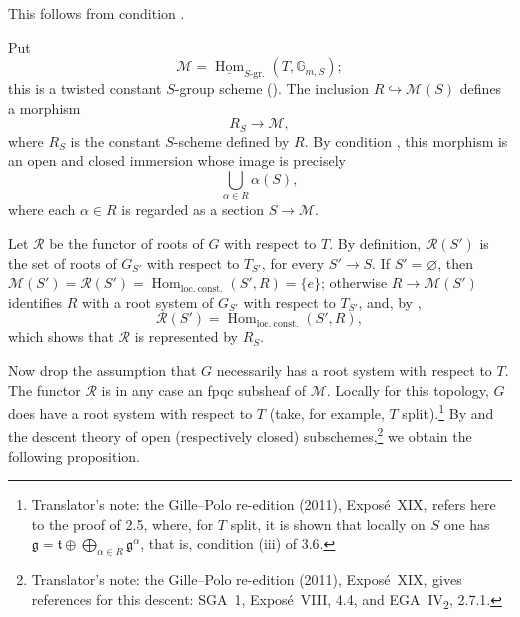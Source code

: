 This follows from condition .

Put
\[
  \mathcal M
  =
  \underline{\operatorname{Hom}}_{S\text{-gr.}}
  (T,\mathbb G_{m,S});
\]
this is a twisted constant \(S\)-group scheme ().  The inclusion
\(R\hookrightarrow\mathcal M(S)\) defines a morphism
\[
  R_S\longrightarrow\mathcal M,
\]
where \(R_S\) is the constant \(S\)-scheme defined by \(R\).  By
condition , this morphism is an open and closed immersion whose
image is precisely
\[
  \bigcup_{\alpha\in R}\alpha(S),
\]
where each \(\alpha\in R\) is regarded as a section
\(S\to\mathcal M\).

Let \(\mathcal R\) be the functor of roots of \(G\) with respect to
\(T\).  By definition, \(\mathcal R(S')\) is the set of roots of
\(G_{S'}\) with respect to \(T_{S'}\), for every \(S'\to S\).  If
\(S'=\varnothing\), then
\(\mathcal M(S')=\mathcal R(S')
=\operatorname{Hom}_{\mathrm{loc.\ const.}}(S',R)=\{e\}\); otherwise
\(R\to\mathcal M(S')\) identifies \(R\) with a root
system of \(G_{S'}\) with respect to \(T_{S'}\), and, by ,
\[
  \mathcal R(S')
  =
  \operatorname{Hom}_{\mathrm{loc.\ const.}}(S',R),
\]
which shows that \(\mathcal R\) is represented by \(R_S\).

Now drop the assumption that \(G\) necessarily has a root system with
respect to \(T\).  The functor \(\mathcal R\) is in any case an fpqc
subsheaf of \(\mathcal M\).  Locally for this topology, \(G\) does
have a root system with respect to \(T\) (take, for example, \(T\)
split).\footnote{Translator's note: the Gille--Polo re-edition (2011), Exposé~XIX, refers here
to the proof of 2.5, where, for \(T\) split, it is shown that locally on \(S\)
one has \(\mathfrak g=\mathfrak t\oplus\bigoplus_{\alpha\in R}\mathfrak g^\alpha\),
that is, condition (iii) of 3.6.}  By  and the
descent theory of open (respectively closed)
subschemes,\footnote{Translator's note: the Gille--Polo re-edition (2011), Exposé~XIX, gives references
for this descent: SGA~1, Exposé~VIII, 4.4, and EGA~IV\textsubscript{2}, 2.7.1.} we obtain the following proposition.
